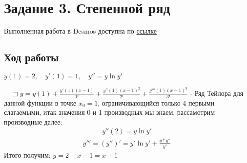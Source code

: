 \documentclass[fleqn]{article}
\begin{document}
\section{Задание 3. Степенной ряд}

Выполненная работа в Desmos доступна по 
\href{https://www.desmos.com/calculator/0imxfkpgnf}{ссылке}

\subsection*{Ход работы}

$y(1) = 2, \quad y'(1) = 1, \quad y'' = y\ln{y'}$

$\quad\sqsupset y = y(1) + \frac{y'(1)(x-1)}{1!} + \frac{y''(1)(x-1)^2}{2!} + \frac{y'''(1)(x-1)^3}{3!}$ - Ряд Тейлора для данной функции в точке $x_0 = 1$, ограничивающийся только 4 первыми слагаемыми, итак значения 0 и 1 производных мы знаем, рассамотрим производные далее:
\begin{align}
    y''(2) = y\ln{y'}
\end{align}
\begin{align}    
    y''' = (y'')' = y'\ln{y'} + \frac{y * y''}{y'}
\end{align}
Итого получим:
$y = 2 + x - 1 = x + 1$
\end{document}
